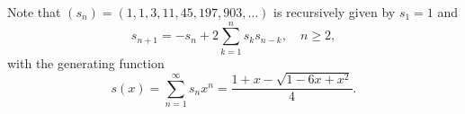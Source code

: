 \documentclass[
final
]{dmtcs-episciences}
\newtheorem{theorem}{Theorem}[section]%
\theoremstyle{definition}
\theoremstyle{remark}
\begin{document}
Note that $(s_n)=(1, 1, 3, 11, 45, 197, 903, \dots)$ is recursively given by $s_1 = 1$ and
\[
s_{n+1} = -s_n + 2 \sum_{k=1}^n s_k s_{n-k}, \quad n\ge 2,
\]
with the generating function
\[
s(x) = \sum_{n=1}^\infty s_n x^n = \frac{1+x-\sqrt{1-6x+x^2}}{4}.
\]
%
%
%
%
%
%
%
\end{document}
